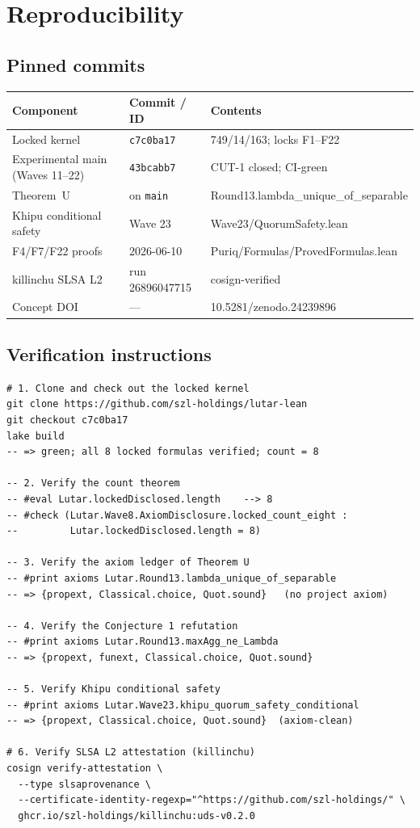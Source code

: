 \documentclass[11pt,letterpaper]{article}
\newcommand{\lean}[1]{{\small\ttfamily #1}}
\newcommand{\lb}{\discretionary{}{}{}}
\theoremstyle{definition}
\begin{document}
\section{Reproducibility}
\label{app:repro}

\subsection{Pinned commits}

\begin{center}\small
\begin{tabular}{@{}p{4.5cm}p{2.5cm}p{5.0cm}@{}}
\toprule
\textbf{Component} & \textbf{Commit / ID} & \textbf{Contents} \\
\midrule
Locked kernel & \texttt{c7c0ba17} & 749/14/163; locks F1--F22 \\
Experimental main (Waves 11--22) & \texttt{43bcabb7} & CUT-1 closed; CI-green \\
Theorem~U & on \texttt{main} & \lean{Round13.\lb lambda\_\lb unique\_\lb of\_\lb separable} \\
Khipu conditional safety & Wave 23 & \lean{Wave23/\lb QuorumSafety.\lb lean} \\
F4/F7/F22 proofs & 2026-06-10 & \lean{Puriq/\lb Formulas/\lb ProvedFormulas.\lb lean} \\
killinchu SLSA L2 & run 26896047715 & cosign-verified \\
Concept DOI & --- & 10.5281/zenodo.24239896 \\
\bottomrule
\end{tabular}
\end{center}

\subsection{Verification instructions}

\begin{lstlisting}
# 1. Clone and check out the locked kernel
git clone https://github.com/szl-holdings/lutar-lean
git checkout c7c0ba17
lake build
-- => green; all 8 locked formulas verified; count = 8

-- 2. Verify the count theorem
-- #eval Lutar.lockedDisclosed.length    --> 8
-- #check (Lutar.Wave8.AxiomDisclosure.locked_count_eight :
--         Lutar.lockedDisclosed.length = 8)

-- 3. Verify the axiom ledger of Theorem U
-- #print axioms Lutar.Round13.lambda_unique_of_separable
-- => {propext, Classical.choice, Quot.sound}   (no project axiom)

-- 4. Verify the Conjecture 1 refutation
-- #print axioms Lutar.Round13.maxAgg_ne_Lambda
-- => {propext, funext, Classical.choice, Quot.sound}

-- 5. Verify Khipu conditional safety
-- #print axioms Lutar.Wave23.khipu_quorum_safety_conditional
-- => {propext, Classical.choice, Quot.sound}  (axiom-clean)

# 6. Verify SLSA L2 attestation (killinchu)
cosign verify-attestation \
  --type slsaprovenance \
  --certificate-identity-regexp="^https://github.com/szl-holdings/" \
  ghcr.io/szl-holdings/killinchu:uds-v0.2.0
\end{lstlisting}
\end{document}
